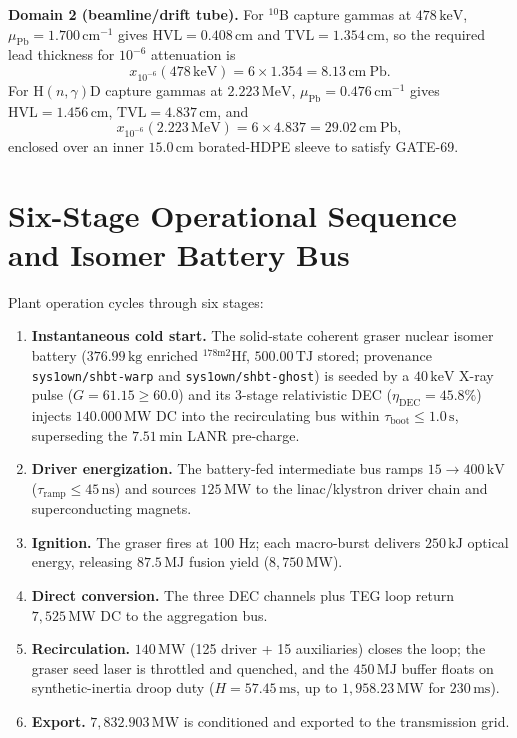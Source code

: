\documentclass[10pt,journal,compsoc]{IEEEtran}
\newcommand{\MW}{\,\mathrm{MW}}
\newcommand{\MeV}{\,\mathrm{MeV}}
\newcommand{\keV}{\,\mathrm{keV}}
\newcommand{\cm}{\,\mathrm{cm}}
\newcommand{\MJ}{\,\mathrm{MJ}}
\newcommand{\kJ}{\,\mathrm{kJ}}
\begin{document}
\textbf{Domain 2 (beamline/drift tube).} For $^{10}$B capture gammas at
$478\keV$, $\mu_{\mathrm{Pb}} = 1.700\,\mathrm{cm^{-1}}$ gives
$\mathrm{HVL} = 0.408\cm$ and $\mathrm{TVL} = 1.354\cm$, so the required
lead thickness for $10^{-6}$ attenuation is
\begin{equation}
x_{10^{-6}}(478\keV) = 6\times 1.354 = 8.13\cm\ \mathrm{Pb}.
\end{equation}
For H$(n,\gamma)$D capture gammas at $2.223\MeV$,
$\mu_{\mathrm{Pb}} = 0.476\,\mathrm{cm^{-1}}$ gives
$\mathrm{HVL} = 1.456\cm$, $\mathrm{TVL} = 4.837\cm$, and
\begin{equation}
x_{10^{-6}}(2.223\MeV) = 6\times 4.837 = 29.02\cm\ \mathrm{Pb},
\end{equation}
enclosed over an inner $15.0\cm$ borated-HDPE sleeve to satisfy GATE-69.

\section{Six-Stage Operational Sequence and Isomer Battery Bus}
Plant operation cycles through six stages:
\begin{enumerate}
\item \textbf{Instantaneous cold start.} The solid-state coherent graser
      nuclear isomer battery ($376.99\,\mathrm{kg}$ enriched
      $^{178\mathrm{m}2}\mathrm{Hf}$, $500.00\,\mathrm{TJ}$ stored;
      provenance \texttt{sys1own/shbt-warp} and
      \texttt{sys1own/shbt-ghost}) is seeded by a $40\,\mathrm{keV}$
      X-ray pulse ($G = 61.15 \ge 60.0$) and its 3-stage relativistic DEC
      ($\eta_{\mathrm{DEC}} = 45.8\%$) injects $140.000\,\mathrm{MW}$ DC
      into the recirculating bus within $\tau_{\mathrm{boot}} \le
      1.0\,\mathrm{s}$, superseding the $7.51\,\mathrm{min}$ LANR
      pre-charge.
\item \textbf{Driver energization.} The battery-fed intermediate bus
      ramps $15\to400\,\mathrm{kV}$ ($\tau_{\mathrm{ramp}} \le
      45\,\mathrm{ns}$) and sources $125\MW$ to the linac/klystron
      driver chain and superconducting magnets.
\item \textbf{Ignition.} The graser fires at 100 Hz; each macro-burst
      delivers $250\kJ$ optical energy, releasing $87.5\MJ$ fusion yield
      ($8{,}750\MW$).
\item \textbf{Direct conversion.} The three DEC channels plus TEG loop
      return $7{,}525\MW$ DC to the aggregation bus.
\item \textbf{Recirculation.} $140\MW$ (125 driver + 15 auxiliaries)
      closes the loop; the graser seed laser is throttled and quenched,
      and the $450\MJ$ buffer floats on synthetic-inertia droop duty
      ($H = 57.45\,\mathrm{ms}$, up to $1{,}958.23\,\mathrm{MW}$ for
      $230\,\mathrm{ms}$).
\item \textbf{Export.} $7{,}832.903\MW$ is conditioned and exported to the
      transmission grid.
\end{enumerate}
\end{document}
